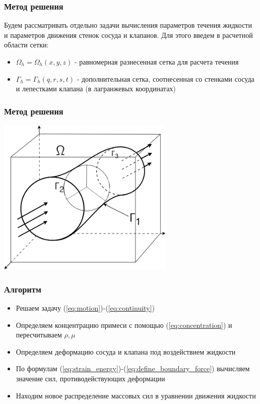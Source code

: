 \documentclass[14pt]{beamer}
\begin{document}
\begin{frame}
\frametitle{Метод решения}
Будем рассматривать отдельно задачи вычисления параметров течения жидкости и параметров движения стенок сосуда и клапанов. Для этого введем в расчетной области сетки:
\begin{itemize}
    \item[\MVRightarrow] $\Omega_h = \Omega_h(x, y, z)$ - равномерная разнесенная сетка для расчета течения
    \item[\MVRightarrow] $\Gamma_h = \Gamma_h(q, r, s, t)$ - дополнительная сетка, соотнесенная со стенками сосуда и лепестками клапана (в лагранжевых координатах)
\end{itemize}

\end{frame}

\begin{frame}
\frametitle{Метод решения}
    \begin{center}
        \includegraphics[width=8.5cm]{area_ibm_3d.png}
    \end{center}
\end{frame}

\begin{frame}
\frametitle{Алгоритм}
    \begin{itemize}
        \item[\MVRightarrow] Решаем задачу (\ref{eq:motion})-(\ref{eq:continuity})
        \item[\MVRightarrow] Определяем концентрацию примеси с помощью (\ref{eq:concentration}) и пересчитываем $\rho, \mu$
        \item[\MVRightarrow] Определяем деформацию сосуда и клапана под воздействием жидкости
        \item[\MVRightarrow] По формулам (\ref{eq:strain_energy})-(\ref{eq:define_boundary_force}) вычисляем значение сил, противодействующих деформации
        \item[\MVRightarrow] Находим новое распределение массовых сил в уравнении движения жидкости
    \end{itemize}
\end{frame}
\end{document}
